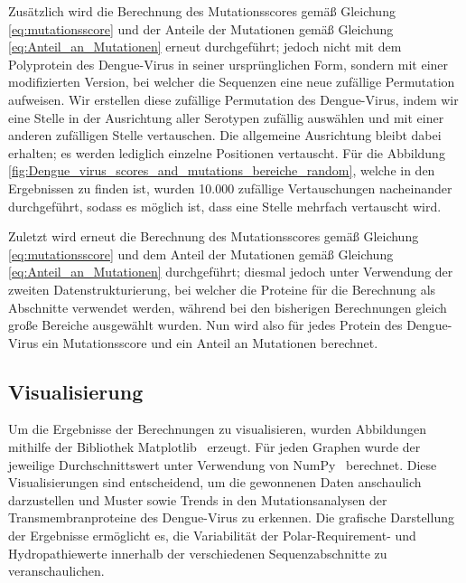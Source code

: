 \documentclass[german,version-2022-01]{uzl-thesis}
\begin{document}
Zus\"atzlich wird die Berechnung des Mutationsscores gem\"a\ss{} Gleichung \ref{eq:mutationsscore} und der Anteile der Mutationen gem\"a\ss{} Gleichung \ref{eq:Anteil_an_Mutationen} erneut durchgef\"uhrt; jedoch nicht mit dem Polyprotein des Dengue-Virus in seiner urspr\"unglichen Form, sondern mit einer modifizierten Version, bei welcher die Sequenzen eine neue zuf\"allige Permutation aufweisen. Wir erstellen diese zuf\"allige Permutation des Dengue-Virus, indem wir eine Stelle in der Ausrichtung aller Serotypen zuf\"allig ausw\"ahlen und mit einer anderen zuf\"alligen Stelle vertauschen. Die allgemeine Ausrichtung bleibt dabei erhalten; es werden lediglich einzelne Positionen vertauscht. F\"ur die Abbildung \ref{fig:Dengue_virus_scores_and_mutations_bereiche_random}, welche in den Ergebnissen zu finden ist, wurden 10.000 zuf\"allige Vertauschungen nacheinander durchgef\"uhrt, sodass es m\"oglich ist, dass eine Stelle mehrfach vertauscht wird.

Zuletzt wird erneut die Berechnung des Mutationsscores gem\"a\ss{} Gleichung \ref{eq:mutationsscore} und dem Anteil der Mutationen gem\"a\ss{} Gleichung \ref{eq:Anteil_an_Mutationen} durchgef\"uhrt; diesmal jedoch unter Verwendung der zweiten Datenstrukturierung, bei welcher die Proteine f\"ur die Berechnung als Abschnitte verwendet werden, w\"ahrend bei den bisherigen Berechnungen gleich gro\ss{}e Bereiche ausgew\"ahlt wurden. Nun wird also f\"ur jedes Protein des Dengue-Virus ein Mutationsscore und ein Anteil an Mutationen berechnet.

\subsection{Visualisierung}
Um die Ergebnisse der Berechnungen zu visualisieren, wurden Abbildungen mithilfe der Bibliothek Matplotlib~\cite{matplotlib} erzeugt. F\"ur jeden Graphen wurde der jeweilige Durchschnittswert unter Verwendung von NumPy~\cite{numpy} berechnet. Diese Visualisierungen sind entscheidend, um die gewonnenen Daten anschaulich darzustellen und Muster sowie Trends in den Mutationsanalysen der Transmembranproteine des Dengue-Virus zu erkennen. Die grafische Darstellung der Ergebnisse erm\"oglicht es, die Variabilit\"at der Polar-Requirement- und Hydropathiewerte innerhalb der verschiedenen Sequenzabschnitte zu veranschaulichen.
\end{document}

